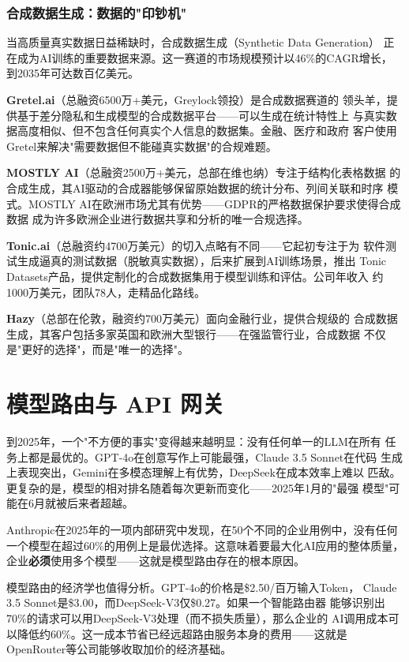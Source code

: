 \subsubsection{合成数据生成：数据的"印钞机"}
当高质量真实数据日益稀缺时，合成数据生成（Synthetic Data Generation）
正在成为AI训练的重要数据来源。这一赛道的市场规模预计以46\%的CAGR增长，
到2035年可达数百亿美元。

\textbf{Gretel.ai}（总融资6500万+美元，Greylock领投）是合成数据赛道的
领头羊，提供基于差分隐私和生成模型的合成数据平台——可以生成在统计特性上
与真实数据高度相似、但不包含任何真实个人信息的数据集。金融、医疗和政府
客户使用Gretel来解决"需要数据但不能碰真实数据"的合规难题。

\textbf{MOSTLY AI}（总融资2500万+美元，总部在维也纳）专注于结构化表格数据
的合成生成，其AI驱动的合成器能够保留原始数据的统计分布、列间关联和时序
模式。MOSTLY AI在欧洲市场尤其有优势——GDPR的严格数据保护要求使得合成数据
成为许多欧洲企业进行数据共享和分析的唯一合规选择。

\textbf{Tonic.ai}（总融资约4700万美元）的切入点略有不同——它起初专注于为
软件测试生成逼真的测试数据（脱敏真实数据），后来扩展到AI训练场景，推出
Tonic Datasets产品，提供定制化的合成数据集用于模型训练和评估。公司年收入
约1000万美元，团队78人，走精品化路线。

\textbf{Hazy}（总部在伦敦，融资约700万美元）面向金融行业，提供合规级的
合成数据生成，其客户包括多家英国和欧洲大型银行——在强监管行业，合成数据
不仅是"更好的选择"，而是"唯一的选择"。


\section{模型路由与 API 网关}
\label{sec:platform-routing}

到2025年，一个"不方便的事实"变得越来越明显：没有任何单一的LLM在所有
任务上都是最优的。GPT-4o在创意写作上可能最强，Claude 3.5 Sonnet在代码
生成上表现突出，Gemini在多模态理解上有优势，DeepSeek在成本效率上难以
匹敌。更复杂的是，模型的相对排名随着每次更新而变化——2025年1月的"最强
模型"可能在6月就被后来者超越。

Anthropic在2025年的一项内部研究中发现，在50个不同的企业用例中，没有任何
一个模型在超过60\%的用例上是最优选择。这意味着要最大化AI应用的整体质量，
企业\textbf{必须}使用多个模型——这就是模型路由存在的根本原因。

模型路由的经济学也值得分析。GPT-4o的价格是\$2.50/百万输入Token，
Claude 3.5 Sonnet是\$3.00，而DeepSeek-V3仅\$0.27。如果一个智能路由器
能够识别出70\%的请求可以用DeepSeek-V3处理（而不损失质量），那么企业的
AI调用成本可以降低约60\%。这一成本节省已经远超路由服务本身的费用——这就是
OpenRouter等公司能够收取加价的经济基础。

